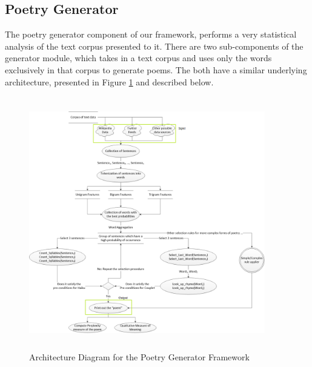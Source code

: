 \documentclass[10pt, letter,twocolumn]{IEEEtran}
\begin{document}
\subsection{Poetry Generator}
The poetry generator component of our framework, performs a very statistical analysis of the text corpus presented to it. There are two sub-components of the generator module, which takes in a text corpus and uses only the words exclusively in that corpus to generate poems. The both have a similar underlying architecture, presented in Figure \ref{architecture2} and described below.
\begin{figure}[ht]
  \centering
    \includegraphics[width=10.3cm, height=11cm]{Images/arch2}
    \caption{Architecture Diagram for the Poetry Generator Framework}
  \label{architecture2}
\end{figure}
\end{document}
